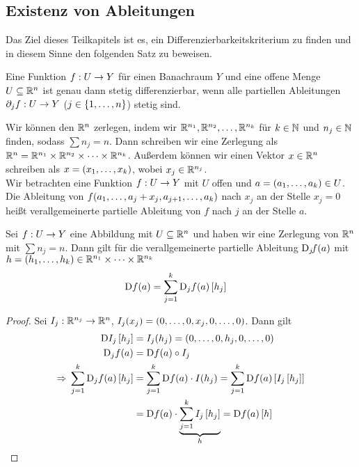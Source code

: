 \subsection{Existenz von Ableitungen}

Das Ziel dieses Teilkapitels ist es, ein Differenzierbarkeitskriterium zu finden und in diesem Sinne den folgenden Satz zu beweisen.

\begin{satz} %
    \marginnote{[11. Jul]}
    \label{satz:existenz-ableitung}
    Eine Funktion $f: U\rightarrow{} Y$ für einen Banachraum $Y$ und eine offene Menge $U\subseteq \mathbb{R}^n$ ist genau dann stetig differenzierbar, wenn alle partiellen Ableitungen $\partial_j f: U\rightarrow{} Y$ ($j\in\left\{1,\ldots, n\right\}$) stetig sind.
\end{satz}

\begin{definition}
    Wir können den $\mathbb{R}^n$ zerlegen, indem wir $\mathbb{R}^{n_1}, \mathbb{R}^{n_2}, \ldots, \mathbb{R}^{n_k}$ für $k\in\mathbb{N}$ und $n_j\in\mathbb{N}$ finden, sodass $\sum n_j = n$. Dann schreiben wir eine Zerlegung als $\mathbb{R}^n = \mathbb{R}^{n_1}\times \mathbb{R}^{n_2}\times\dots\times\mathbb{R}^{n_k}$. Außerdem können wir einen Vektor $x\in\mathbb{R}^n$ schreiben als $x=\left(x_1, \ldots, x_k\right)$, wobei $x_j\in\mathbb{R}^{n_j}$.\\
    Wir betrachten eine Funktion $f: U\rightarrow{} Y$ mit $U$ offen und $a=\left(a_1, \ldots, a_k\right)\in U$. Die Ableitung von $f\of{a_1, \ldots, a_{j} + x_j, a_{j+1},\ldots, a_k}$ nach $x_j$ an der Stelle $x_j = 0$ heißt verallgemeinerte partielle Ableitung von $f$ nach $j$ an der Stelle $a$.
\end{definition}

\begin{lemma} %
    \label{lemma:veralg-part-diff}
    Sei $f: U\rightarrow{} Y$ eine Abbildung mit $U\subseteq\mathbb{R}^n$ und haben wir eine Zerlegung von $\mathbb{R}^n$ mit $\sum n_j = n$. Dann gilt für die verallgemeinerte partielle Ableitung $\text{D}_j\! f\of{a}$ mit $h=\left(h_1, \ldots, h_k\right)\in\mathbb{R}^{n_1}\times\dots \times\mathbb{R}^{n_k}$
    \begin{align*}
        \D f\of{a} &= \sum_{j=1}^{k} \text{D}_j f\of{a}\interv{h_j}
    \end{align*}
    \begin{proof}
        Sei $I_j: \mathbb{R}^{n_j}\rightarrow{}\mathbb{R}^{n}$, $I_j\of{x_j} = \pair{0,\ldots, 0, x_j, 0,\ldots, 0}$. Dann gilt
        \begin{align*}
            \D I_j\interv{h_j} &= I_j\of{h_j} = \pair{0,\ldots, 0, h_j, 0, \ldots, 0}\\
            \text{D}_j f\of{a} &= \D f\of{a}\circ I_j\\
            \impl \sum_{j=1}^{k} \text{D}_j f\of{a}\interv{h_j} &= \sum_{j=1}^{k} \D f\of{a} \cdot I\of{h_j} = \sum_{j=1}^{k} \D f\of{a}\interv{I_j\interv{h_j}}\\
            &= \D f\of{a} \cdot \underbrace{\sum_{j=1}^{k} I_j\interv{h_j}}_{h} = \D f\of{a}\interv{h}
        \end{align*}
    \end{proof}
\end{lemma}

